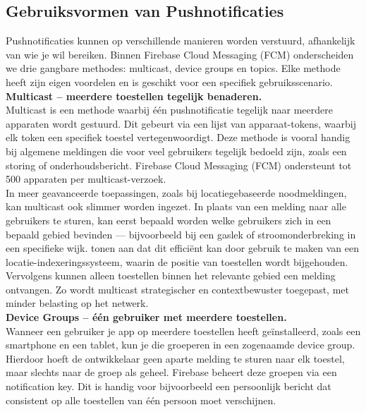 \subsection{Gebruiksvormen van Pushnotificaties}

Pushnotificaties kunnen op verschillende manieren worden verstuurd, afhankelijk van wie je wil bereiken. Binnen Firebase Cloud Messaging (FCM) onderscheiden we drie gangbare methodes: multicast, device groups en topics. Elke methode heeft zijn eigen voordelen en is geschikt voor een specifiek gebruiksscenario.\\

\textbf{Multicast – meerdere toestellen tegelijk benaderen.}\\
Multicast is een methode waarbij één pushnotificatie tegelijk naar meerdere apparaten wordt gestuurd. Dit gebeurt via een lijst van apparaat-tokens, waarbij elk token een specifiek toestel vertegenwoordigt. Deze methode is vooral handig bij algemene meldingen die voor veel gebruikers tegelijk bedoeld zijn, zoals een storing of onderhoudsbericht. Firebase Cloud Messaging (FCM) ondersteunt tot 500 apparaten per multicast-verzoek.\\

In meer geavanceerde toepassingen, zoals bij locatiegebaseerde noodmeldingen, kan multicast ook slimmer worden ingezet. In plaats van een melding naar alle gebruikers te sturen, kan eerst bepaald worden welke gebruikers zich in een bepaald gebied bevinden — bijvoorbeeld bij een gaslek of stroomonderbreking in een specifieke wijk. \textcite{ThuThuZan2018} tonen aan dat dit efficiënt kan door gebruik te maken van een locatie-indexeringssysteem, waarin de positie van toestellen wordt bijgehouden. Vervolgens kunnen alleen toestellen binnen het relevante gebied een melding ontvangen. Zo wordt multicast strategischer en contextbewuster toegepast, met minder belasting op het netwerk.\\

\textbf{Device Groups – één gebruiker met meerdere toestellen.}\\
Wanneer een gebruiker je app op meerdere toestellen heeft geïnstalleerd, zoals een smartphone en een tablet, kun je die groeperen in een zogenaamde device group. Hierdoor hoeft de ontwikkelaar geen aparte melding te sturen naar elk toestel, maar slechts naar de groep als geheel. Firebase beheert deze groepen via een notification key. Dit is handig voor bijvoorbeeld een persoonlijk bericht dat consistent op alle toestellen van één persoon moet verschijnen.\\

